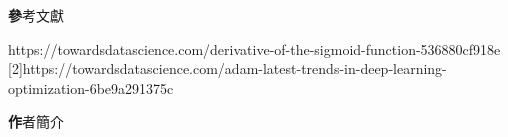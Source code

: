 \documentclass[14pt,a4paper]{report}  %
\begin{document}
\newpage
\begin{center}
\LARGE\textbf 參考文獻\\
\end{center}
\begin{flushleft}
\begin{Large}
[1]\quad https://towardsdatascience.com/derivative-of-the-sigmoid-function-536880cf918e\\

[2]\quad https://towardsdatascience.com/adam-latest-trends-in-deep-learning-optimization-6be9a291375c\\
\end{Large}
\end{flushleft}
\newpage
\begin{center}
\LARGE\textbf 作者簡介\\
\end{center}

\end{document}
